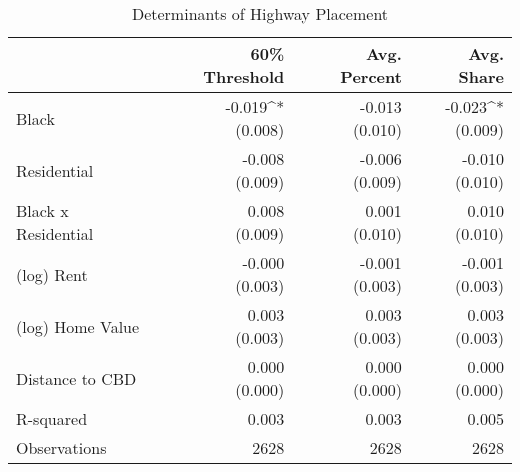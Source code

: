 \begin{table}[h]
\centering
\caption{Determinants of Highway Placement}
\label{tab:initial_results}
\begin{tabular*}{\textwidth}{@{\extracolsep{\fill}}l*{3}{r}}
\toprule
 & 60\% Threshold & Avg. Percent & Avg. Share \\
\midrule
Black & \makecell[tr]{-0.019^{*} \\ (0.008)} & \makecell[tr]{-0.013 \\ (0.010)} & \makecell[tr]{-0.023^{*} \\ (0.009)} \\
Residential & \makecell[tr]{-0.008 \\ (0.009)} & \makecell[tr]{-0.006 \\ (0.009)} & \makecell[tr]{-0.010 \\ (0.010)} \\
Black x Residential & \makecell[tr]{0.008 \\ (0.009)} & \makecell[tr]{0.001 \\ (0.010)} & \makecell[tr]{0.010 \\ (0.010)} \\
(log) Rent & \makecell[tr]{-0.000 \\ (0.003)} & \makecell[tr]{-0.001 \\ (0.003)} & \makecell[tr]{-0.001 \\ (0.003)} \\
(log) Home Value & \makecell[tr]{0.003 \\ (0.003)} & \makecell[tr]{0.003 \\ (0.003)} & \makecell[tr]{0.003 \\ (0.003)} \\
Distance to CBD & \makecell[tr]{0.000 \\ (0.000)} & \makecell[tr]{0.000 \\ (0.000)} & \makecell[tr]{0.000 \\ (0.000)} \\
R-squared & 0.003 & 0.003 & 0.005 \\
Observations & 2628 & 2628 & 2628 \\
\bottomrule
\end{tabular*}
\end{table}
